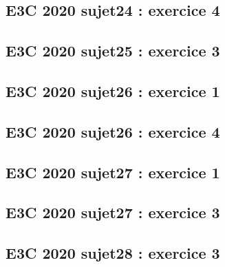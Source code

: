 \documentclass[lang=fr,edition=teacher,layout=sheet]{mxbook}
\begin{document}
\par\bigskip
{}\subsection*{E3C 2020 sujet24 : exercice 4}
\begingroup\endgroup
\par\bigskip
{}\subsection*{E3C 2020 sujet25 : exercice 3}
\begingroup\endgroup
\par\bigskip
{}\subsection*{E3C 2020 sujet26 : exercice 1}
\begingroup\endgroup
\par\bigskip
{}\subsection*{E3C 2020 sujet26 : exercice 4}
\begingroup\endgroup
\par\bigskip
{}\subsection*{E3C 2020 sujet27 : exercice 1}
\begingroup\endgroup
\par\bigskip
{}\subsection*{E3C 2020 sujet27 : exercice 3}
\begingroup\endgroup
\par\bigskip
{}\subsection*{E3C 2020 sujet28 : exercice 3}
\begingroup\endgroup
\par\bigskip
\end{document}
